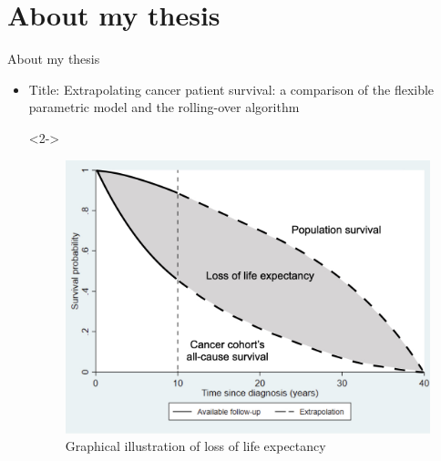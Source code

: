 \documentclass{beamer}
\begin{document}

\section{About my thesis}
\begin{frame}{About my thesis}

\begin{itemize}
	\item<1-> Title: Extrapolating cancer patient survival: a comparison of the flexible parametric model and the rolling-over algorithm	
	
	\item[]<2->\begin{figure}
	\begin{center}
	\includegraphics[scale=0.18]{image/LLE_edit}
	\caption{\centering Graphical illustration of loss of life expectancy}
	\end{center}
\end{figure}
\end{itemize}
\end{frame}
\end{document}
